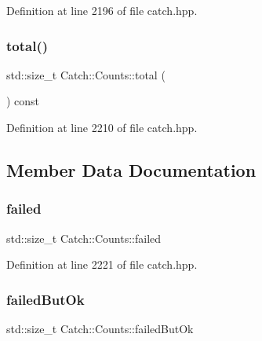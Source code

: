 Definition at line 2196 of file catch.\+hpp.

\hypertarget{struct_catch_1_1_counts_a94f969c09cf52d1339c085c9603cd1d3}{}\label{struct_catch_1_1_counts_a94f969c09cf52d1339c085c9603cd1d3} 
\subsubsection{\texorpdfstring{total()}{total()}}
{\footnotesize\ttfamily std\+::size\+\_\+t Catch\+::\+Counts\+::total (\begin{DoxyParamCaption}{ }\end{DoxyParamCaption}) const\hspace{0.3cm}{\ttfamily [inline]}}



Definition at line 2210 of file catch.\+hpp.



\subsection{Member Data Documentation}
\hypertarget{struct_catch_1_1_counts_a19982a3817a3bc2c07f0290e71f497a3}{}\label{struct_catch_1_1_counts_a19982a3817a3bc2c07f0290e71f497a3} 
\subsubsection{\texorpdfstring{failed}{failed}}
{\footnotesize\ttfamily std\+::size\+\_\+t Catch\+::\+Counts\+::failed}



Definition at line 2221 of file catch.\+hpp.

\hypertarget{struct_catch_1_1_counts_ac090973a2ff51394cd452718e75c073e}{}\label{struct_catch_1_1_counts_ac090973a2ff51394cd452718e75c073e} 
\subsubsection{\texorpdfstring{failed\+But\+Ok}{failedButOk}}
{\footnotesize\ttfamily std\+::size\+\_\+t Catch\+::\+Counts\+::failed\+But\+Ok}



